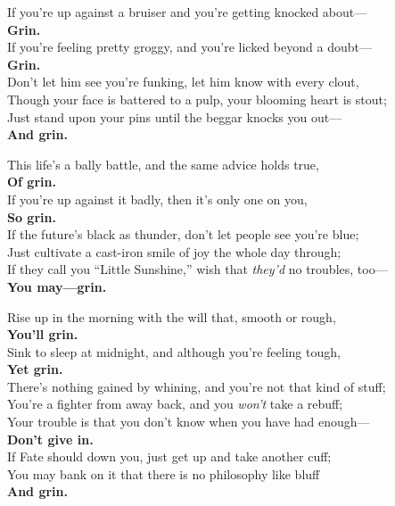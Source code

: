 

\begin{poemblock}
If you're up against a bruiser and you're getting knocked about---\\
\hspace*{18em}\textbf{Grin.}\\
If you're feeling pretty groggy, and you're licked beyond a doubt---\\
\hspace*{18em}\textbf{Grin.}\\
Don't let him see you're funking, let him know with every clout,\\
Though your face is battered to a pulp, your blooming heart is stout;\\
Just stand upon your pins until the beggar knocks you out---\\
\hspace*{18em}\textbf{And grin.}


This life's a bally battle, and the same advice holds true,\\
\hspace*{18em}\textbf{Of grin.}\\
If you're up against it badly, then it's only one on you,\\
\hspace*{18em}\textbf{So grin.}\\
If the future's black as thunder, don't let people see you're blue;\\
Just cultivate a cast-iron smile of joy the whole day through;\\
If they call you ``Little Sunshine,'' wish that \textit{they'd} no troubles, too---\\
\hspace*{18em}\textbf{You may---grin.}


Rise up in the morning with the will that, smooth or rough,\\
\hspace*{18em}\textbf{You'll grin.}\\
Sink to sleep at midnight, and although you're feeling tough,\\
\hspace*{18em}\textbf{Yet grin.}\\
There's nothing gained by whining, and you're not that kind of stuff;\\
You're a fighter from away back, and you \textit{won't} take a rebuff;\\
Your trouble is that you don't know when you have had enough---\\
\hspace*{18em}\textbf{Don't give in.}\\
If Fate should down you, just get up and take another cuff;\\
You may bank on it that there is no philosophy like bluff\\
\hspace*{18em}\textbf{And grin.}
\end{poemblock}